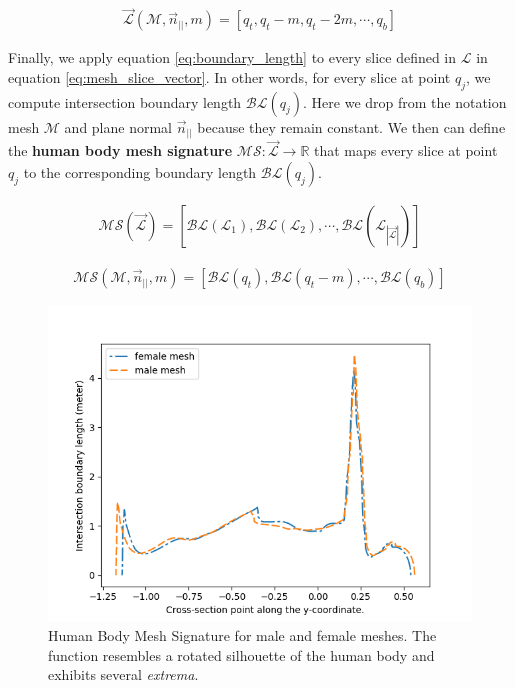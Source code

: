 \documentclass[runningheads, orivec]{llncs}
\begin{document}
\begin{align}\label{eq:mesh_slice_vector}
\vec{\mathcal{L}}(\mathcal{M}, \vec{n}_{||}, m) = \left[ q_t, q_t-m, q_t-2 
m,\cdots, 
q_b \right]
\end{align}

Finally, we apply equation \ref{eq:boundary_length} to every slice defined in
$\mathcal{L}$ in equation \ref{eq:mesh_slice_vector}. In other words, for every 
slice at point 
$q_j$, we compute intersection boundary length $\mathcal{BL}(q_j)$. Here we 
drop from the notation mesh 
$\mathcal{M}$ and plane normal $\vec{n}_{||}$ because they remain constant. We 
then can 
define the \textbf{human body mesh signature} $\mathcal{MS}: 
\vec{\mathcal{L}} \to \mathbb{R}$ that maps every slice at point $q_j$ to the 
corresponding boundary length $\mathcal{BL}(q_j)$.

\begin{align}\label{eq:mesh_signature_short}
\mathcal{MS}(\vec{\mathcal{L}}) = [\mathcal{BL}(\mathcal{L}_1), 
\mathcal{BL}(\mathcal{L}_2), \cdots, 
\mathcal{BL}(\mathcal{L}_{|\vec{\mathcal{L}}|})]
\end{align}

\begin{align}\label{eq:mesh_signature}
\mathcal{MS}(\mathcal{M}, \vec{n}_{||}, m) = 
[\mathcal{BL}(q_t), \mathcal{BL}(q_t-m), \cdots, \mathcal{BL}(q_b)]
\end{align}

\begin{figure}[t]
	\begin{center}
		\includegraphics[width=\linewidth]{mesh_signature.png}
	\end{center}
	\caption{Human Body Mesh Signature for male and female meshes. The 
		function resembles a rotated silhouette of the human body and exhibits 
		several \textit{extrema}.}
	\label{fig:hbm_signature}
\end{figure}
\end{document}
